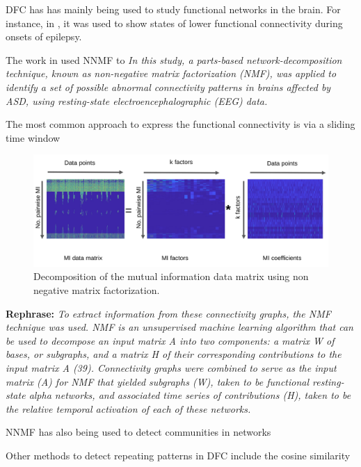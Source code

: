 DFC has has mainly being used to study functional networks in the brain. For instance, in \cite{Christiaen2020Dynamicfunctionalconnectivity}, it was used to show states of lower functional connectivity during onsets of epilepsy.


The work in \cite{Zhou2020Earlychildhooddevelopmental} used NNMF to \textit{In this study, a parts-based network-decomposition technique, known as non-negative matrix factorization (NMF), was applied to identify a set of possible abnormal connectivity patterns in brains affected by ASD, using resting-state electroencephalographic (EEG) data.}
 
The most common approach to express the functional connectivity is via a sliding time window \cite{Preti2017dynamicfunctionalconnectome}
\TODO

\begin{figure}[!th]
	\centering
	\includegraphics[width=0.9\columnwidth]{fig/nnmf.png}
	\caption{Decomposition of the mutual information data matrix using non negative matrix factorization.}
	\label{fig:nnmf}
\end{figure}

\textbf{Rephrase:} \textit{To extract information from these connectivity graphs, the NMF \cite{Fu2019Nonnegativematrixfactorization} technique was used. NMF is an unsupervised machine learning algorithm that can be used to decompose an input matrix A into two components: a matrix W of bases, or subgraphs, and a matrix H of their corresponding contributions to the input matrix A (39). Connectivity graphs were combined to serve as the input matrix (A) for NMF that yielded subgraphs (W), taken to be functional resting-state alpha networks, and associated time series of contributions (H), taken to be the relative temporal activation of each of these networks.}

NNMF has also being used to detect communities in networks \cite{Wang2011Communitydiscoveryusing,Luo2021Symmetricnonnegativematrix}


Other methods to detect repeating patterns in DFC include the cosine similarity \cite{Menon2019comparisonstaticdynamic}

